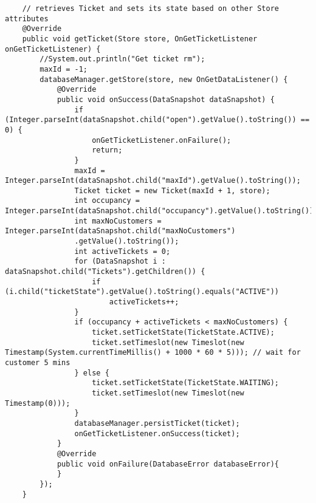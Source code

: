 \begin{lstlisting}
    // retrieves Ticket and sets its state based on other Store attributes
    @Override
    public void getTicket(Store store, OnGetTicketListener onGetTicketListener) {
        //System.out.println("Get ticket rm");
        maxId = -1;
        databaseManager.getStore(store, new OnGetDataListener() {
            @Override
            public void onSuccess(DataSnapshot dataSnapshot) {
                if (Integer.parseInt(dataSnapshot.child("open").getValue().toString()) == 0) {
                    onGetTicketListener.onFailure();
                    return;
                }
                maxId = Integer.parseInt(dataSnapshot.child("maxId").getValue().toString());
                Ticket ticket = new Ticket(maxId + 1, store);
                int occupancy = Integer.parseInt(dataSnapshot.child("occupancy").getValue().toString());
                int maxNoCustomers = Integer.parseInt(dataSnapshot.child("maxNoCustomers")
                .getValue().toString());
                int activeTickets = 0;
                for (DataSnapshot i : dataSnapshot.child("Tickets").getChildren()) {
                    if (i.child("ticketState").getValue().toString().equals("ACTIVE"))
                        activeTickets++;
                }
                if (occupancy + activeTickets < maxNoCustomers) {
                    ticket.setTicketState(TicketState.ACTIVE);
                    ticket.setTimeslot(new Timeslot(new Timestamp(System.currentTimeMillis() + 1000 * 60 * 5))); // wait for customer 5 mins
                } else {
                    ticket.setTicketState(TicketState.WAITING);
                    ticket.setTimeslot(new Timeslot(new Timestamp(0)));
                }
                databaseManager.persistTicket(ticket);
                onGetTicketListener.onSuccess(ticket);
            }
            @Override
            public void onFailure(DatabaseError databaseError){
            }
        });
    }


\end{lstlisting}
